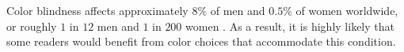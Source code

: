 


\noindent Color blindness affects approximately $8\%$ of men and $0.5\%$ of women worldwide, or roughly $1$ in $12$ men and $1$ in $200$ women .
As a result, it is highly likely that some readers would benefit from color choices that accommodate this condition.
